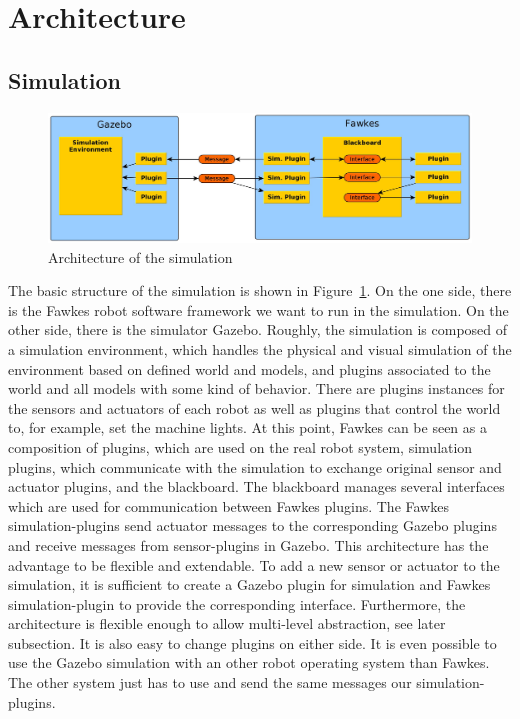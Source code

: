 \section{Architecture}
\label{sec:architecture}

\subsection{Simulation}
\label{sec:architecture_simulation}
\begin{figure}
\includegraphics[width=\textwidth]{tabs/fawkes_gazebo}
\caption{Architecture of the simulation}
\label{fig:fawkes_gazebo}
\end{figure}
The basic structure of the simulation is shown in Figure~\ref{fig:fawkes_gazebo}. On the one side, there is the Fawkes robot software framework we want to run in the simulation. On the other side, there is the simulator Gazebo. Roughly, the simulation is composed of a simulation environment, which handles the physical and visual simulation of the environment based on defined world and models, and plugins associated to the world and all models with some kind of behavior. There are plugins instances for the sensors and actuators of each robot as well as plugins that control the world to, for example, set the machine lights. At this point, Fawkes can be seen as a composition of plugins, which are used on the real robot system, simulation plugins, which communicate with the simulation to exchange original sensor and actuator plugins, and the blackboard. The blackboard manages several interfaces which are used for communication between Fawkes plugins. The Fawkes simulation-plugins send actuator messages to the corresponding Gazebo plugins and receive messages from sensor-plugins in Gazebo. This architecture has the advantage to be flexible and extendable. To add a new sensor or actuator to the simulation, it is sufficient to create a Gazebo plugin for simulation and Fawkes simulation-plugin to provide the corresponding interface. Furthermore, the architecture is flexible enough to allow multi-level abstraction, see later subsection. It is also easy to change plugins on either side. It is even possible to use the Gazebo simulation with an other robot operating system than Fawkes. The other system just has to use and send the same messages our simulation-plugins.


